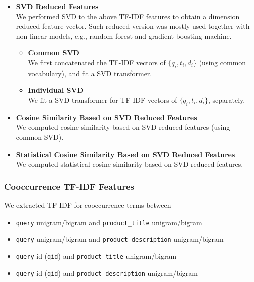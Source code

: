 \documentclass[12pt]{article}
\begin{document}
\begin{itemize}
\item \textbf{SVD Reduced Features}\\
We performed SVD to the above TF-IDF features to obtain a dimension reduced feature vector. Such reduced version was mostly used together with non-linear models, e.g., random forest and gradient boosting machine.
\begin{itemize}
\item \textbf{Common SVD}\\
We first concatenated the TF-IDF vectors of $\{q_i, t_i, d_i\}$ (using common vocabulary), and fit a SVD transformer.
\item \textbf{Individual SVD}\\
We fit a SVD transformer for TF-IDF vectors of $\{q_i, t_i, d_i\}$, separately.
\end{itemize}
\item \textbf{Cosine Similarity Based on SVD Reduced Features}\\
We computed cosine similarity based on SVD reduced features (using common SVD).
\item \textbf{Statistical Cosine Similarity Based on SVD Reduced Features}\\
We computed statistical cosine similarity based on SVD reduced features.
\end{itemize}
\subsubsection{Cooccurrence TF-IDF Features}
\label{subsubsec:Cooccurrence_TFIDF_Features}
We extracted TF-IDF for cooccurrence terms between
\begin{itemize}
\item \texttt{query} unigram/bigram and \texttt{product\_title} unigram/bigram
\item \texttt{query} unigram/bigram and \texttt{product\_description} unigram/bigram
\item \texttt{query} id (\texttt{qid}) and \texttt{product\_title} unigram/bigram
\item \texttt{query} id (\texttt{qid}) and \texttt{product\_description} unigram/bigram
\end{itemize}
\end{document}
